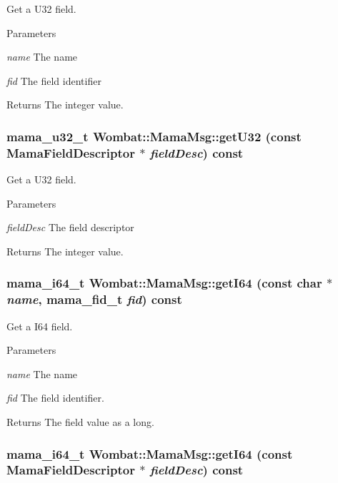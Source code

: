 Get a U32 field. 
\begin{DoxyParams}{Parameters}
\item[{\em name}]The name \item[{\em fid}]The field identifier \end{DoxyParams}
\begin{DoxyReturn}{Returns}
The integer value. 
\end{DoxyReturn}
\hypertarget{classWombat_1_1MamaMsg_a7ef51f9e163bd3b76eddd047da556a5d}{
\subsubsection[{getU32}]{\setlength{\rightskip}{0pt plus 5cm}mama\_\-u32\_\-t Wombat::MamaMsg::getU32 (const {\bf MamaFieldDescriptor} $\ast$ {\em fieldDesc}) const}}
\label{classWombat_1_1MamaMsg_a7ef51f9e163bd3b76eddd047da556a5d}


Get a U32 field. 
\begin{DoxyParams}{Parameters}
\item[{\em fieldDesc}]The field descriptor \end{DoxyParams}
\begin{DoxyReturn}{Returns}
The integer value. 
\end{DoxyReturn}
\hypertarget{classWombat_1_1MamaMsg_ad2073c6e714a05469f778093a3b09ef9}{
\subsubsection[{getI64}]{\setlength{\rightskip}{0pt plus 5cm}mama\_\-i64\_\-t Wombat::MamaMsg::getI64 (const char $\ast$ {\em name}, \/  mama\_\-fid\_\-t {\em fid}) const}}
\label{classWombat_1_1MamaMsg_ad2073c6e714a05469f778093a3b09ef9}


Get a I64 field. 
\begin{DoxyParams}{Parameters}
\item[{\em name}]The name \item[{\em fid}]The field identifier. \end{DoxyParams}
\begin{DoxyReturn}{Returns}
The field value as a long. 
\end{DoxyReturn}
\hypertarget{classWombat_1_1MamaMsg_aa13027401b1384865173a7ec5bc7d54d}{
\subsubsection[{getI64}]{\setlength{\rightskip}{0pt plus 5cm}mama\_\-i64\_\-t Wombat::MamaMsg::getI64 (const {\bf MamaFieldDescriptor} $\ast$ {\em fieldDesc}) const}}
\label{classWombat_1_1MamaMsg_aa13027401b1384865173a7ec5bc7d54d}


